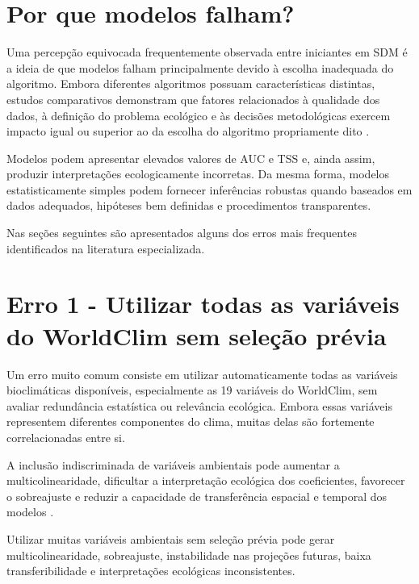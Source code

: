 \section{Por que modelos falham?}

Uma percepção equivocada frequentemente observada entre iniciantes em SDM é a
ideia de que modelos falham principalmente devido à escolha inadequada do
algoritmo. Embora diferentes algoritmos possuam características distintas,
estudos comparativos demonstram que fatores relacionados à qualidade dos dados,
à definição do problema ecológico e às decisões metodológicas exercem impacto
igual ou superior ao da escolha do algoritmo propriamente dito
\citep{elith2006novel, araujo2007ensemble, guisan2017habitat}.

Modelos podem apresentar elevados valores de AUC e TSS e, ainda assim,
produzir interpretações ecologicamente incorretas. Da mesma forma, modelos
estatisticamente simples podem fornecer inferências robustas quando baseados em
dados adequados, hipóteses bem definidas e procedimentos transparentes.

Nas seções seguintes são apresentados alguns dos erros mais frequentes
identificados na literatura especializada.

\section{Erro 1 - Utilizar todas as variáveis do WorldClim sem seleção prévia}

Um erro muito comum consiste em utilizar automaticamente todas as variáveis
bioclimáticas disponíveis, especialmente as 19 variáveis do WorldClim, sem
avaliar redundância estatística ou relevância ecológica. Embora essas variáveis
representem diferentes componentes do clima, muitas delas são fortemente
correlacionadas entre si.

A inclusão indiscriminada de variáveis ambientais pode aumentar a
multicolinearidade, dificultar a interpretação ecológica dos coeficientes,
favorecer o sobreajuste e reduzir a capacidade de transferência espacial e
temporal dos modelos \citep{dormann2013collinearity, guisan2017habitat}.

\begin{sdmwarningbox}
	Utilizar muitas variáveis ambientais sem seleção prévia pode gerar
	multicolinearidade, sobreajuste, instabilidade nas projeções futuras,
	baixa transferibilidade e interpretações ecológicas inconsistentes.
\end{sdmwarningbox}

